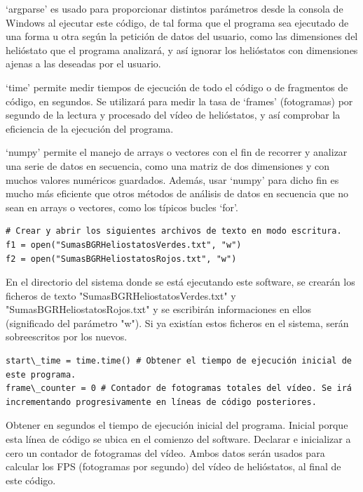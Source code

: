 ‘argparse’ es usado para proporcionar distintos parámetros desde la consola de Windows al ejecutar este código, de tal forma que el programa sea ejecutado de una forma u otra según la petición de datos del usuario, como las dimensiones del helióstato que el programa analizará, y así ignorar los helióstatos con dimensiones ajenas a las deseadas por el usuario.

‘time’ permite medir tiempos de ejecución de todo el código o de fragmentos de código, en segundos. Se utilizará para medir la tasa de ‘frames’ (fotogramas) por segundo de la lectura y procesado del vídeo de helióstatos, y así comprobar la eficiencia de la ejecución del programa.

‘numpy’ permite el manejo de arrays o vectores con el fin de recorrer y analizar una serie de datos en secuencia, como una matriz de dos dimensiones y con muchos valores numéricos guardados. Además, usar ‘numpy’ para dicho fin es mucho más eficiente que otros métodos de análisis de datos en secuencia que no sean en arrays o vectores, como los típicos bucles ‘for’.\\[20pt]

\begin{lstlisting}
# Crear y abrir los siguientes archivos de texto en modo escritura.
f1 = open("SumasBGRHeliostatosVerdes.txt", "w")
f2 = open("SumasBGRHeliostatosRojos.txt", "w")
\end{lstlisting}

En el directorio del sistema donde se está ejecutando este software, se crearán los ficheros de texto "SumasBGRHeliostatosVerdes.txt" y "SumasBGRHeliostatosRojos.txt" y se escribirán informaciones en ellos (significado del parámetro "w"). Si ya existían estos ficheros en el sistema, serán sobreescritos por los nuevos.\\[20pt]

\begin{lstlisting}
start\_time = time.time() # Obtener el tiempo de ejecución inicial de este programa.
frame\_counter = 0 # Contador de fotogramas totales del vídeo. Se irá incrementando progresivamente en líneas de código posteriores.
\end{lstlisting}

Obtener en segundos el tiempo de ejecución inicial del programa. Inicial porque esta línea de código se ubica en el comienzo del software. Declarar e inicializar a cero un contador de fotogramas del vídeo. Ambos datos serán usados para calcular los FPS (fotogramas por segundo) del vídeo de helióstatos, al final de este código.\\[20pt]

